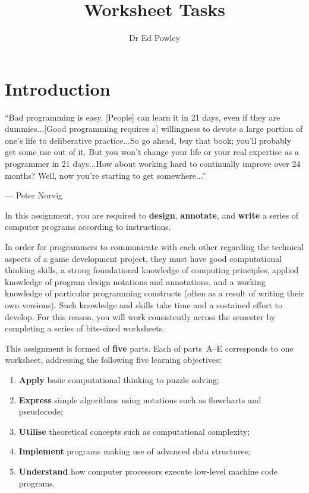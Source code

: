 \documentclass{../../fal_assignment}
\title{Worksheet Tasks}
\author{Dr Ed Powley}
\begin{document}
\maketitle

\section*{Introduction}

\begin{marginquote}
``Bad programming is easy. [People] can learn it in 21 days, even if they are dummies...[Good programming requires a] willingness to devote a large portion of one's life to deliberative practice...So go ahead, buy that book; you'll probably get some use out of it. But you won't change your life or your real expertise as a programmer in 21 days...How about working hard to continually improve over 24 months? Well, now you're starting to get somewhere...''
\par --- Peter Norvig
\end{marginquote}

In this assignment, you are required to \textbf{design}, \textbf{annotate}, and \textbf{write} a series of computer programs according to instructions.

In order for programmers to communicate with each other regarding the technical aspects of a game development project, they must have good computational thinking skills, a strong foundational knowledge of computing principles, applied knowledge of program design notations and annotations, and a working knowledge of particular programming constructs (often as a result of writing their own versions). Such knowledge and skills take time and a sustained effort to develop. For this reason, you will work consistently across the semester by completing a series of bite-sized worksheets.

This assignment is formed of \textbf{five} parts.
Each of parts~A--E corresponds to one worksheet, addressing the following five learning objectives:
\begin{enumerate}[label=(\Alph*)]
	\item \textbf{Apply} basic computational thinking to puzzle solving;
	\item \textbf{Express} simple algorithms using notations such as flowcharts and pseudocode;
	\item \textbf{Utilise} theoretical concepts such as computational complexity;
	\item \textbf{Implement} programs making use of advanced data structures;
	\item \textbf{Understand} how computer processors execute low-level machine code programs.
\end{enumerate}
\end{document}

